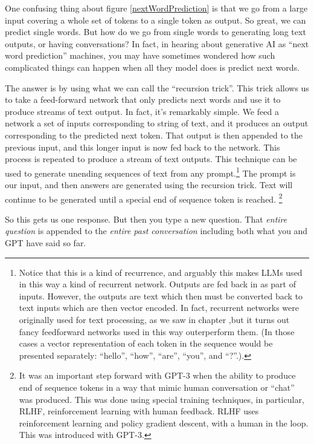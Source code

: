 One confusing thing about figure \ref{nextWordPrediction} is that we go from a large input covering a whole set of tokens to a single token as output. So great, we can predict single words. But how do we go from single words to generating long text outputs, or having conversations? In fact, in hearing about generative AI as ``next word prediction'' machines, you may have sometimes wondered how such complicated things can happen when all they model does is predict next words.

The answer is by using what we can call the ``recursion trick''.  This trick allows us to take a feed-forward network that only predicts next words and use it to produce streams of text output. In fact, it's remarkably simple. We feed a network a set of inputs corresponding to string of text, and it produces an output corresponding to the predicted next token. That output is then appended to the previous input, and this longer input is now fed back to the network. This process is repeated to produce a stream of text outputs.  This technique can be used to generate unending sequences of text from any prompt.\footnote{Notice that this is a kind of recurrence, and arguably this makes LLMs used in this way a kind of recurrent network. Outputs are fed back in as part of inputs. However, the outputs are text which then must be converted back to text inputs which are then vector encoded.  In fact, recurrent networks were originally used for text processing, as we saw in chapter ,but it turns out fancy feedforward networks used in this way outerperform them.  (In those cases a vector representation of each token in the sequence would be presented separately: ``hello'', ``how'', ``are'', ``you'', and ``?''.).} The prompt is our input, and then answers are generated using the recursion trick. Text will continue to be generated until a special end of sequence token is reached. \footnote{It was an important step forward with GPT-3 when the ability to produce end of sequence tokens in a way that mimic human conversation or ``chat'' was produced. This was done using special training techniques, in particular, RLHF, reinforcement learning with human feedback. RLHF uses reinforcement learning and policy gradient descent, with a human in the loop. This was introduced with GPT-3.} 

So this gets us one response. But then you type a new question. That \emph{entire question} is appended to the \emph{entire past conversation} including both what you and GPT have said so far.  

